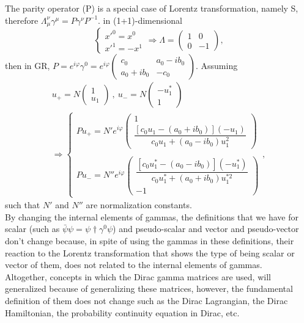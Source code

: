 \documentclass[twocolumn,aps,prb,showpacs]{revtex4-1}
\begin{document}
The parity operator (P) is a special case of Lorentz transformation, namely S, therefore $ \Lambda_{\mu}^{\nu}\gamma^{\mu}=P\gamma^{\nu}P^{-1} $.
in (1+1)-dimensional
\begin{equation}
	\begin{cases}
		x'^{0}=x^{0} \\ 
		x'^{1}=-x^{1}
	\end{cases}
	\Rightarrow 
	\Lambda=
	\begin{pmatrix}
		1 & 0 \\ 0 & -1
	\end{pmatrix},
\end{equation}
then in GR, $ P=e^{i\varphi}\gamma^{0}=e^{i\varphi}
\begin{pmatrix}
c_{0} & a_{0}-ib_{0} \\ a_{0}+ib_{0} & -c_{0}
\end{pmatrix} $. Assuming
\begin{align}
	u_{+}=N
	\begin{pmatrix}
		1 \\ u_{1}
	\end{pmatrix} \ , \  
	u_{-}=N
	\begin{pmatrix}
		-u_{1}^{*} \\ 1
	\end{pmatrix} \ \ \ \ \ \ \ \ \ \ \ \ \ \
	\\
	\Rightarrow
	\begin{cases}
		Pu_{+}=N'e^{i\varphi}
		\begin{pmatrix}
			1 \\ \dfrac{[c_{0}u_{1}-(a_{0}+ib_{0})](-u_{1})}
			{c_{0}u_{1}+(a_{0}-ib_{0})u_{1}^{2}}
		\end{pmatrix} \\ \\
		Pu_{-}=N''e^{i\varphi}
		\begin{pmatrix}
			\dfrac{[c_{0}u_{1}^{*}-(a_{0}-ib_{0})](-u_{1}^{*})}
			{c_{0}u_{1}^{*}+(a_{0}+ib_{0})u_{1}^{*2}} \\ -1
		\end{pmatrix}
	\end{cases},
\end{align}
such that $ N' $ and $ N'' $ are normalization constants.\\
By changing the internal elements of gammas, the definitions that we have for scalar (such as $ \bar{\psi}\psi=\psi\dag\gamma^{0}\psi $) and pseudo-scalar and vector and pseudo-vector don't change because, in spite of using the gammas in these definitions, their reaction to the Lorentz transformation that shows the type of being scalar or vector of them, does not related to the internal elements of gammas.\\
Altogether, concepts in which the Dirac gamma matrices are used, will generalized because of generalizing these matrices, however, the fundamental definition of them does not change such as the Dirac Lagrangian, the Dirac Hamiltonian, the probability continuity equation in Dirac, etc.
\end{document}
